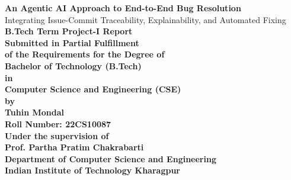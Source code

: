 \begin{titlepage}
\begin{center}
    \textbf{\fontsize{17.28pt}{14pt}\selectfont An Agentic AI Approach to End-to-End Bug Resolution} \\
    \vspace{0.1in}
    \fontsize{14pt}{14pt}\selectfont Integrating Issue-Commit Traceability, Explainability, and Automated Fixing\\
    \vspace{0.6in}
    {\fontsize{15pt}{14pt} \textbf{B.Tech Term Project-I Report \\}}        
    \vspace{0.5in}
    {\large\bf Submitted in Partial Fulfillment\\ of the Requirements for the Degree of}\\
     \vspace{0.3in}
     {\large\bf Bachelor of Technology (B.Tech)}\\
     {\large\bf in}\\
     {\large\bf Computer Science and Engineering (CSE)}\\     
    \vspace{0.5in}
    {\large\bf by}\\
    \vspace{0.3in}
    {\Large\bf Tuhin Mondal}\\
    \vspace{0.1in}
    {\Large\bf Roll Number: 22CS10087}\\
    \vspace{0.05in}
    \vspace{0.5in}
    {\large\bf Under the supervision of}\\
    \vspace{0.2in}
     {\Large\bf  Prof. Partha Pratim Chakrabarti}\\
    \vspace{0.1in}
    {\large\bf Department of Computer Science and Engineering}\\
    {\large\bf Indian Institute of Technology Kharagpur}\\  
    \vspace{0.05in}
    

\end{center}
\end{titlepage}

